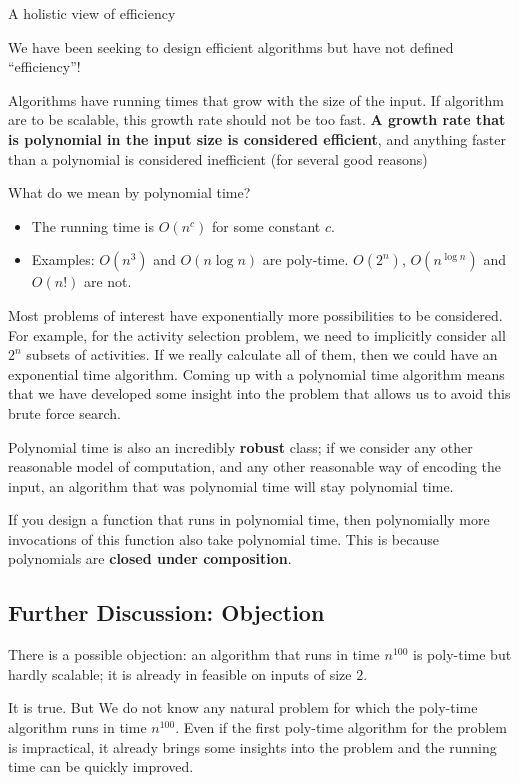A holistic view of efficiency

We have been seeking to design efficient algorithms but have not defined ``efficiency''!

Algorithms have running times that grow with the size of the input. If algorithm are to be scalable, this growth rate should not be too fast. \textbf{A growth rate that is polynomial in the input size is considered efficient}, and anything faster than a polynomial is considered inefficient (for several good reasons)

What do we mean by polynomial time?
\begin{itemize}
	\item The running time is $O(n^c)$ for some constant $c$.
	\item Examples: $O(n^3)$ and $O(n \log n)$ are poly-time. $O(2^n)$, $O(n^{\log n})$ and $O(n!)$ are not.
\end{itemize}

Most problems of interest have exponentially more possibilities to be considered. For example, for the activity selection problem, we need to implicitly consider all $2^n$ subsets of activities. If we really calculate all of them, then we could have an exponential time algorithm. Coming up with a polynomial time algorithm means that we have developed some insight into the problem that allows us to avoid this brute force search.

Polynomial time is also an incredibly \textbf{robust} class; if we consider any other reasonable model of computation, and any other reasonable way of encoding the input, an algorithm that was polynomial time will stay polynomial time. 

If you design a function that runs in polynomial time, then polynomially more invocations of this function also take polynomial time. This is because polynomials are \textbf{closed under composition}.

\subsection{Further Discussion: Objection}
There is a possible objection: an algorithm that runs in time $n^{100}$ is poly-time but hardly scalable; it is already in feasible on inputs of size $2$.

It is true. But We do not know any natural problem for which the poly-time algorithm runs in time $n^{100}$. Even if the first poly-time algorithm for the problem is impractical, it already brings some insights into the problem and the running time can be quickly improved.

